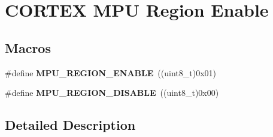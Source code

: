 \hypertarget{group___c_o_r_t_e_x___m_p_u___region___enable}{}\section{C\+O\+R\+T\+EX M\+PU Region Enable}
\label{group___c_o_r_t_e_x___m_p_u___region___enable}
\subsection*{Macros}
\begin{DoxyCompactItemize}
\item 
\#define {\bfseries M\+P\+U\+\_\+\+R\+E\+G\+I\+O\+N\+\_\+\+E\+N\+A\+B\+LE}~((uint8\+\_\+t)0x01)\hypertarget{group___c_o_r_t_e_x___m_p_u___region___enable_gab4d333fe8f5258a5ab0130f138ea70c6}{}\label{group___c_o_r_t_e_x___m_p_u___region___enable_gab4d333fe8f5258a5ab0130f138ea70c6}

\item 
\#define {\bfseries M\+P\+U\+\_\+\+R\+E\+G\+I\+O\+N\+\_\+\+D\+I\+S\+A\+B\+LE}~((uint8\+\_\+t)0x00)\hypertarget{group___c_o_r_t_e_x___m_p_u___region___enable_ga2ce3c45b0757cad5aef279b9b0214b08}{}\label{group___c_o_r_t_e_x___m_p_u___region___enable_ga2ce3c45b0757cad5aef279b9b0214b08}

\end{DoxyCompactItemize}


\subsection{Detailed Description}
